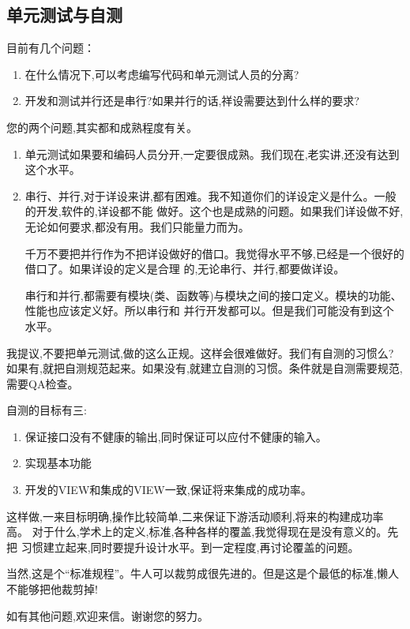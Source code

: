 \documentclass[11pt]{article}
\begin{document}
\subsection{单元测试与自测}
\begin{staff}
\qlogo 目前有几个问题：
\begin{enumerate}
  \item 在什么情况下,可以考虑编写代码和单元测试人员的分离?
  \item  开发和测试并行还是串行?如果并行的话,祥设需要达到什么样的要求?
\end{enumerate}
\end{staff}

\begin{yang}
\ylogo 您的两个问题,其实都和成熟程度有关。
\begin{enumerate}
  \item 单元测试如果要和编码人员分开,一定要很成熟。我们现在,老实讲,还没有达到这个水平。
  \item 串行、并行,对于详设来讲,都有困难。我不知道你们的详设定义是什么。一般的开发,软件的,详设都不能
    做好。这个也是成熟的问题。如果我们详设做不好,无论如何要求,都没有用。我们只能量力而为。

    千万不要把并行作为不把详设做好的借口。我觉得水平不够,已经是一个很好的借口了。如果详设的定义是合理
    的,无论串行、并行,都要做详设。

    串行和并行,都需要有模块(类、函数等)与模块之间的接口定义。模块的功能、性能也应该定义好。所以串行和
    并行开发都可以。但是我们可能没有到这个水平。
\end{enumerate}

我提议,不要把单元测试,做的这么正规。这样会很难做好。我们有自测的习惯么?
如果有,就把自测规范起来。如果没有,就建立自测的习惯。条件就是自测需要规范,
需要QA检查。

自测的目标有三:
\begin{enumerate}
\item 保证接口没有不健康的输出,同时保证可以应付不健康的输入。
  \item 实现基本功能
  \item 开发的VIEW和集成的VIEW一致,保证将来集成的成功率。
\end{enumerate}

这样做,一来目标明确,操作比较简单,二来保证下游活动顺利,将来的构建成功率高。
对于什么,学术上的定义,标准,各种各样的覆盖,我觉得现在是没有意义的。先把
习惯建立起来,同时要提升设计水平。到一定程度,再讨论覆盖的问题。

当然,这是个``标准规程''。牛人可以裁剪成很先进的。但是这是个最低的标准,懒人不能够把他裁剪掉!

如有其他问题,欢迎来信。谢谢您的努力。
\end{yang}
\end{document}

